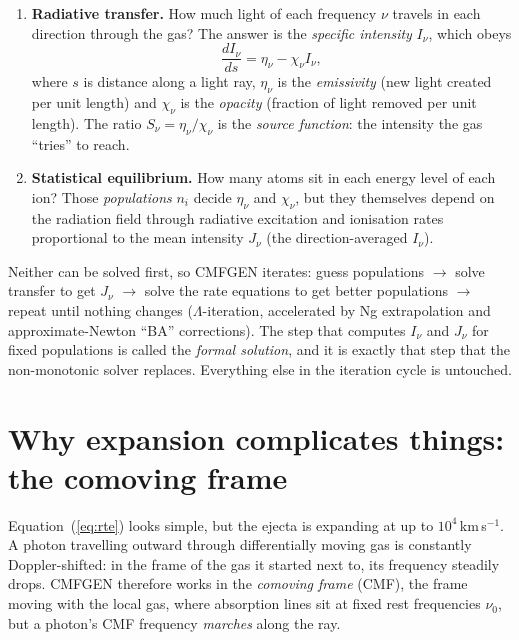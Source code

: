 \documentclass[11pt,a4paper]{article}
\begin{document}
\begin{enumerate}[nosep]
  \item \textbf{Radiative transfer.}  How much light of each frequency
        $\nu$ travels in each direction through the gas?  The answer is
        the \emph{specific intensity} $I_\nu$, which obeys
        \begin{equation}
          \frac{dI_\nu}{ds} = \eta_\nu - \chi_\nu I_\nu,
          \label{eq:rte}
        \end{equation}
        where $s$ is distance along a light ray, $\eta_\nu$ is the
        \emph{emissivity} (new light created per unit length) and
        $\chi_\nu$ is the \emph{opacity} (fraction of light removed per
        unit length).  The ratio $S_\nu = \eta_\nu/\chi_\nu$ is the
        \emph{source function}: the intensity the gas ``tries'' to
        reach.
  \item \textbf{Statistical equilibrium.}  How many atoms sit in each
        energy level of each ion?  Those \emph{populations} $n_i$ decide
        $\eta_\nu$ and $\chi_\nu$, but they themselves depend on the
        radiation field through radiative excitation and ionisation
        rates proportional to the mean intensity $J_\nu$ (the
        direction-averaged $I_\nu$).
\end{enumerate}

Neither can be solved first, so CMFGEN iterates: guess populations
$\rightarrow$ solve transfer to get $J_\nu$ $\rightarrow$ solve the rate
equations to get better populations $\rightarrow$ repeat until nothing
changes ($\Lambda$-iteration, accelerated by Ng extrapolation
\citep{Ng1974} and approximate-Newton ``BA'' corrections).  The step
that computes $I_\nu$ and $J_\nu$ for fixed populations is called the
\emph{formal solution}, and it is exactly that step that the
non-monotonic solver replaces.  Everything else in the iteration cycle
is untouched.

\section{Why expansion complicates things: the comoving frame}
\label{sec:cmf}

Equation~(\ref{eq:rte}) looks simple, but the ejecta is expanding at up
to $10^4$\,km\,s$^{-1}$.  A photon travelling outward through
differentially moving gas is constantly Doppler-shifted: in the frame of
the gas it started next to, its frequency steadily drops.  CMFGEN
therefore works in the \emph{comoving frame} (CMF), the frame moving
with the local gas, where absorption lines sit at fixed rest
frequencies $\nu_0$, but a photon's CMF frequency \emph{marches} along
the ray.
\end{document}
